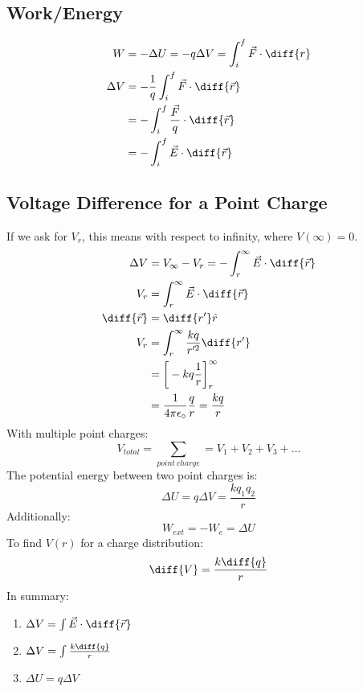 \documentclass{math}
\begin{document}
\subsection*{Work/Energy}
\begin{align*}
  W &= -\Delta U = -q\Delta V = \int_{i}^{f}\vec{F}\cdot\diff{r} \\
  \Delta V &= -\frac{1}{q}\int_{i}^{f}\vec{F}\cdot\diff{\vec{r}} \\
  &= -\int_{i}^{f}\frac{\vec{F}}{q}\cdot\diff{\vec{r}} \\
  &= -\int_{i}^{f}\vec{E}\cdot\diff{\vec{r}}
\end{align*}

\subsection*{Voltage Difference for a Point Charge}
If we ask for \( V_r \), this means with respect to infinity, where \( V(\infty)
= 0 \).
\begin{align*}
  \Delta V &= V_{\infty}-V_r = -\int_{r}^{\infty}\vec{E}\cdot\diff{\vec{r}} \\
  V_r &= \int_{r}^{\infty}\vec{E}\cdot\diff{\vec{r}} \\
  \diff{\vec{r}} &= \diff{r'}\hat{r} \\
  V_r &= \int_{r}^{\infty}\frac{kq}{r'^2}\diff{r'} \\
  &= \bigg[-kq\frac{1}{r}\bigg]_{r}^{\infty} \\
  &= \frac{1}{4\pi\epsilon_{\circ}}\frac{q}{r} = \frac{kq}{r}
\end{align*}
With multiple point charges:
\[ V_{total} = \sum_{point~charge} = V_1+V_2+V_3+\dots \]
The potential energy between two point charges is:
\[ \Delta U = q\Delta V = \frac{kq_1q_2}{r} \]
Additionally:
\[ W_{ext} = -W_e = \Delta U \]
To find \( V(r) \) for a charge distribution:
\[ \diff{V} = \frac{k\diff{q}}{r} \]
In summary:
\begin{enumerate}
  \item \( \Delta V = \int\vec{E}\cdot\diff{\vec{r}} \)
  \item \( \Delta V = \int\frac{k\diff{q}}{r} \)
  \item \( \Delta U = q\Delta V \)
\end{enumerate}
\end{document}
